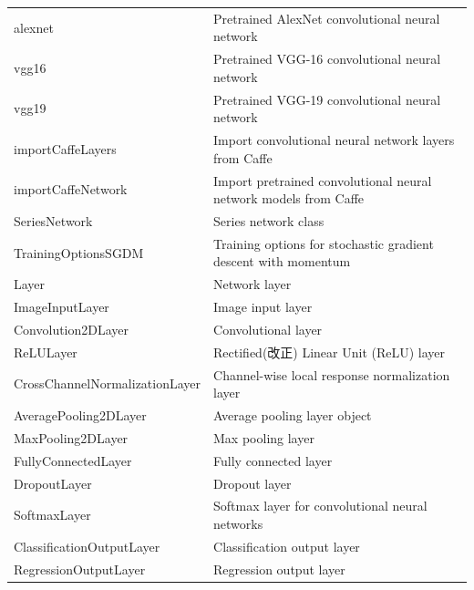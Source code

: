 \begin{table}[H]
\begin{tabularx}{\textwidth}{l|l}
          alexnet &  Pretrained AlexNet convolutional neural network\\
          vgg16  & Pretrained VGG-16 convolutional neural network\\
          vgg19 &  Pretrained VGG-19 convolutional neural network\\
          importCaffeLayers &  Import convolutional neural network layers from Caffe\\
          importCaffeNetwork & Import pretrained convolutional neural network models from Caffe\\
          SeriesNetwork &  Series network class\\
          TrainingOptionsSGDM &  Training options for stochastic gradient descent with momentum\\
          Layer&   Network layer\\
          ImageInputLayer&  Image input layer\\
          Convolution2DLayer & Convolutional layer\\
          ReLULayer &  Rectified(改正) Linear Unit (ReLU) layer\\
          CrossChannelNormalizationLayer&  Channel-wise local response normalization layer\\
          AveragePooling2DLayer &  Average pooling layer object\\
          MaxPooling2DLayer &  Max pooling layer\\
          FullyConnectedLayer &  Fully connected layer\\
          DropoutLayer & Dropout layer\\
          SoftmaxLayer & Softmax layer for convolutional neural networks\\
          ClassificationOutputLayer &  Classification output layer\\
          RegressionOutputLayer &  Regression output layer\\
          \bottomrule
          \end{tabularx}
        \end{table}

